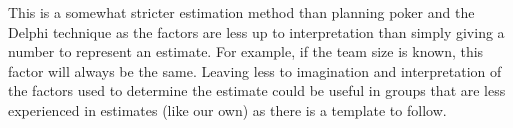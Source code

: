 This is a somewhat stricter estimation method than planning poker and the Delphi
technique as the factors are less up to interpretation than simply giving a
number to represent an estimate. For example, if the team size is known, this
factor will always be the same. Leaving less to imagination and interpretation
of the factors used to determine the estimate could be useful in groups that are
less experienced in estimates (like our own) as there is a template to follow.
